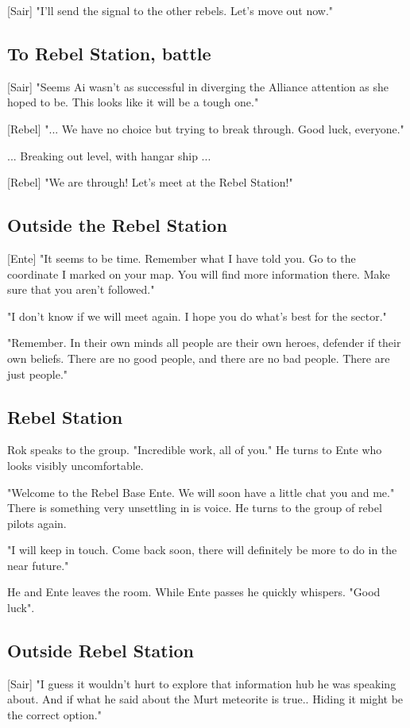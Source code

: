 \documentclass[a4paper,12pt]{article}
\begin{document}
[Sair] "I'll send the signal to the other rebels. Let's move out now."

\subsection{To Rebel Station, battle}

[Sair] "Seems Ai wasn't as successful in diverging the Alliance attention as she hoped to be. This looks like it will be a tough one."

[Rebel] "... We have no choice but trying to break through. Good luck, everyone."

... Breaking out level, with hangar ship ...

[Rebel] "We are through! Let's meet at the Rebel Station!"

\subsection{Outside the Rebel Station}

[Ente] "It seems to be time. Remember what I have told you. Go to the coordinate I marked on your map.
You will find more information there. Make sure that you aren't followed."

"I don't know if we will meet again. I hope you do what's best for the sector."

"Remember. In their own minds all people are their own heroes, defender if their own beliefs.
There are no good people, and there are no bad people. There are just people."

\subsection{Rebel Station}

Rok speaks to the group. "Incredible work, all of you."
He turns to Ente who looks visibly uncomfortable. 

"Welcome to the Rebel Base Ente. We will soon have a little chat you and me."
There is something very unsettling in is voice. He turns to the group of rebel pilots again.

"I will keep in touch. Come back soon, there will definitely be more to do in the near future."

He and Ente leaves the room. While Ente passes he quickly whispers. "Good luck".

\subsection{Outside Rebel Station}

[Sair] "I guess it wouldn't hurt to explore that information hub he was speaking about. And if what he said about the
Murt meteorite is true.. Hiding it might be the correct option."
\end{document}
